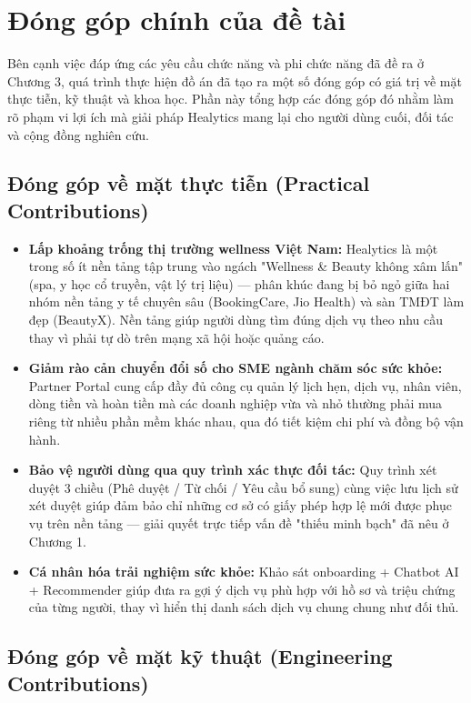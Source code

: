 \section{Đóng góp chính của đề tài}

Bên cạnh việc đáp ứng các yêu cầu chức năng và phi chức năng đã đề ra ở Chương 3, quá trình thực hiện đồ án đã tạo ra một số đóng góp có giá trị về mặt thực tiễn, kỹ thuật và khoa học. Phần này tổng hợp các đóng góp đó nhằm làm rõ phạm vi lợi ích mà giải pháp Healytics mang lại cho người dùng cuối, đối tác và cộng đồng nghiên cứu.

\subsection{Đóng góp về mặt thực tiễn (Practical Contributions)}

\begin{itemize}
    \item \textbf{Lấp khoảng trống thị trường wellness Việt Nam:} Healytics là một trong số ít nền tảng tập trung vào ngách "Wellness \& Beauty không xâm lấn" (spa, y học cổ truyền, vật lý trị liệu) --- phân khúc đang bị bỏ ngỏ giữa hai nhóm nền tảng y tế chuyên sâu (BookingCare, Jio Health) và sàn TMĐT làm đẹp (BeautyX). Nền tảng giúp người dùng tìm đúng dịch vụ theo nhu cầu thay vì phải tự dò trên mạng xã hội hoặc quảng cáo.
    \item \textbf{Giảm rào cản chuyển đổi số cho SME ngành chăm sóc sức khỏe:} Partner Portal cung cấp đầy đủ công cụ quản lý lịch hẹn, dịch vụ, nhân viên, dòng tiền và hoàn tiền mà các doanh nghiệp vừa và nhỏ thường phải mua riêng từ nhiều phần mềm khác nhau, qua đó tiết kiệm chi phí và đồng bộ vận hành.
    \item \textbf{Bảo vệ người dùng qua quy trình xác thực đối tác:} Quy trình xét duyệt 3 chiều (Phê duyệt / Từ chối / Yêu cầu bổ sung) cùng việc lưu lịch sử xét duyệt giúp đảm bảo chỉ những cơ sở có giấy phép hợp lệ mới được phục vụ trên nền tảng --- giải quyết trực tiếp vấn đề "thiếu minh bạch" đã nêu ở Chương 1.
    \item \textbf{Cá nhân hóa trải nghiệm sức khỏe:} Khảo sát onboarding + Chatbot AI + Recommender giúp đưa ra gợi ý dịch vụ phù hợp với hồ sơ và triệu chứng của từng người, thay vì hiển thị danh sách dịch vụ chung chung như đối thủ.
\end{itemize}

\subsection{Đóng góp về mặt kỹ thuật (Engineering Contributions)}

